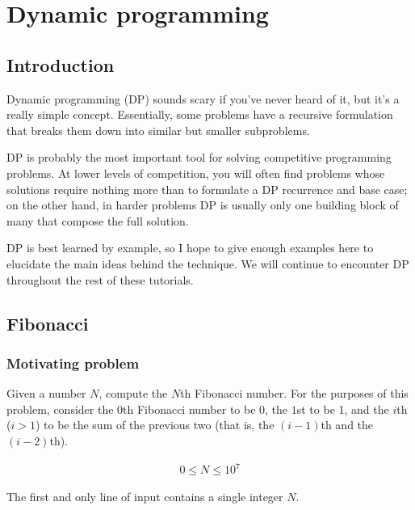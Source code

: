 \section{Dynamic programming}

\subsection{Introduction}

Dynamic programming (DP) sounds scary if you've never heard of it, but it's a really simple concept. Essentially, some problems have a recursive formulation that breaks them down into similar but smaller subproblems.

DP is probably the most important tool for solving competitive programming problems. At lower levels of competition, you will often find problems whose solutions require nothing more than to formulate a DP recurrence and base case; on the other hand, in harder problems DP is usually only one building block of many that compose the full solution.

DP is best learned by example, so I hope to give enough examples here to elucidate the main ideas behind the technique. We will continue to encounter DP throughout the rest of these tutorials.

\subsection{Fibonacci}

\subsubsection*{Motivating problem}


Given a number $N$, compute the $N$th Fibonacci number. For the purposes of this problem, consider the $0$th Fibonacci number to be 0, the $1$st to be 1, and the $i$th ($i > 1$) to be the sum of the previous two (that is, the $(i-1)$th and the $(i-2)$th).


\begin{gather*}
0 \leq N \leq 10^7
\end{gather*}


The first and only line of input contains a single integer $N$.


